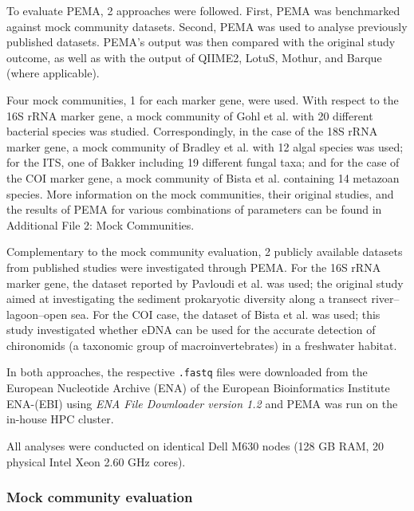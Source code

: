    To evaluate PEMA, 2 approaches were followed. 
   First, PEMA was benchmarked against mock community datasets. 
   Second, PEMA was used to analyse previously published datasets. 
   PEMA's output was then compared with the original study outcome, as well as with the output of QIIME2, LotuS, Mothur, and Barque (where applicable).

   Four mock communities, 1 for each marker gene, were used. With respect to the 16S rRNA marker gene, a mock community of Gohl et al. \citep{gohl2016systematic} with 20 different bacterial species was studied. 
   Correspondingly, in the case of the 18S rRNA marker gene, a mock community of Bradley et al. \citep{bradley2016} with 12 algal species was used; 
   for the ITS, one of Bakker \citep{bakker2018fungal} including 19 different fungal taxa; 
   and for the case of the COI marker gene, a mock community of Bista et al. \citep{bista2018performance} containing 14 metazoan species. 
   More information on the mock communities, their original studies, and the results of PEMA for various combinations of parameters can be found in Additional File 2: Mock Communities.

   Complementary to the mock community evaluation, 2 publicly available datasets from published studies were investigated through PEMA. 
   For the 16S rRNA marker gene, the dataset reported by Pavloudi et al. \citep{pavloudi2017sediment} was used; 
   the original study aimed at investigating the sediment prokaryotic diversity along a transect river–lagoon–open sea. 
   For the COI case, the dataset of Bista et al. \citep{bista2017annual} was used; 
   this study investigated whether eDNA can be used for the accurate detection of chironomids (a taxonomic group of macroinvertebrates) in a freshwater habitat.

   In both approaches, the respective \texttt{.fastq} files were downloaded from the European Nucleotide Archive (ENA) of the European Bioinformatics Institute ENA-(EBI) using \textit{ENA File Downloader version 1.2} \citep{harrison2019european} and PEMA was run on the in-house HPC cluster.

   All analyses were conducted on identical Dell M630 nodes (128 GB RAM, 20 physical Intel Xeon 2.60 GHz cores).


   \subsubsection*{Mock community evaluation}

